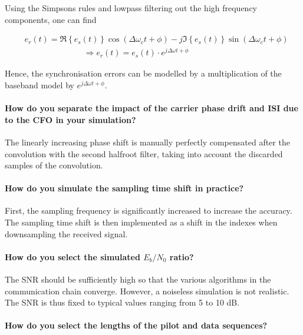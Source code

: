 Using the Simpsons rules and lowpass filtering out the high frequency components, one can find

\begin{equation*}
\begin{split}
    &e_r(t) =  \Re \left\{ e_s(t) \right\} \cos ( \Delta \omega_c t + \phi) - j   \Im \left\{ e_s(t) \right\} \sin ( \Delta \omega_c t + \phi)\\
    &\hspace{3cm} \Rightarrow e_r(t) = e_s(t) \cdot e^{j\Delta \omega t + \phi}
\end{split}
\end{equation*}

Hence, the synchronisation errors can be modelled by a multiplication of the baseband model by $ e^{j\Delta \omega t + \phi}$.

\paragraph{How do you separate the impact of the carrier phase drift and ISI due to the CFO in your simulation?} \mbox{}

The linearly increasing phase shift is manually perfectly compensated after the convolution with the second halfroot filter, taking into account the discarded samples of the convolution. 

\paragraph{How do you simulate the sampling time shift in practice?} \mbox{}

First, the sampling frequency is significantly increased to increase the accuracy. The sampling time shift is then implemented as a shift in the indexes when downsampling the received signal.

\paragraph{How do you select the simulated $E_b/N_0$ ratio?} \mbox{}

The SNR should be sufficiently high so that the various algorithms in the communication chain converge. However, a noiseless simulation is not realistic. The SNR is thus fixed to typical values ranging from 5 to 10 \si{\deci\bel}.

\paragraph{How do you select the lengths of the pilot and data sequences?} \mbox{}

